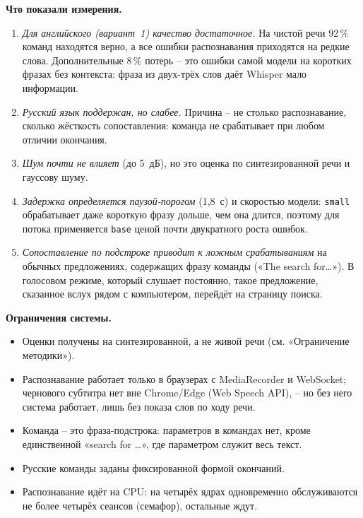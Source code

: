\textbf{Что показали измерения.}
\begin{enumerate}
  \item \emph{Для английского (вариант~1) качество достаточное.} На чистой
  речи 92\,\% команд находятся верно, а все ошибки распознавания
  приходятся на редкие слова. Дополнительные 8\,\% потерь -- это
  ошибки самой модели на коротких фразах без контекста: фраза из двух-трёх
  слов даёт Whisper мало информации.
  \item \emph{Русский язык поддержан, но слабее.} Причина -- не столько
  распознавание, сколько жёсткость сопоставления: команда не
  срабатывает при любом отличии окончания.
  \item \emph{Шум почти не влияет} (до 5~дБ), но это оценка по
  синтезированной речи и гауссову шуму.
  \item \emph{Задержка определяется паузой-порогом} (1{,}8~с) и
  скоростью модели: \texttt{small} обрабатывает даже короткую фразу
  дольше, чем она длится, поэтому для потока применяется \texttt{base}
  ценой почти двукратного роста ошибок.
  \item \emph{Сопоставление по подстроке приводит к ложным
  срабатываниям} на обычных предложениях, содержащих фразу команды
  («The search for\ldots»). В голосовом режиме, который слушает
  постоянно, такое предложение, сказанное вслух рядом с
  компьютером, перейдёт на страницу поиска.
\end{enumerate}

\textbf{Ограничения системы.}
\begin{itemize}
  \item Оценки получены на синтезированной, а не живой речи (см.
  «Ограничение методики»).
  \item Распознавание работает только в браузерах с MediaRecorder и
  WebSocket; чернового субтитра нет вне Chrome/Edge (Web Speech API), --
  но без него система работает, лишь без показа слов по ходу речи.
  \item Команда -- это фраза-подстрока: параметров в командах нет,
  кроме единственной «search for \ldots», где параметром служит
  весь текст.
  \item Русские команды заданы фиксированной формой окончаний.
  \item Распознавание идёт на CPU: на четырёх ядрах одновременно
  обслуживаются не более четырёх сеансов (семафор), остальные ждут.
\end{itemize}

